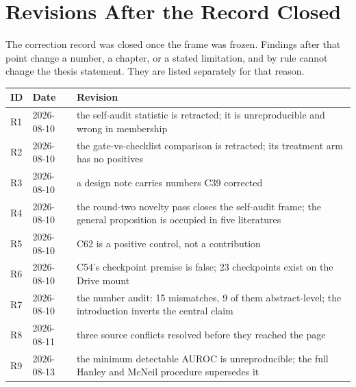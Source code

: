 \section{Revisions After the Record Closed}

The correction record was closed once the frame was frozen. Findings after that point
change a number, a chapter, or a stated limitation, and by rule cannot change the
thesis statement. They are listed separately for that reason.

\singlespacing
\renewcommand{\arraystretch}{0.9}
\footnotesize
\begin{longtable}{@{}p{0.35in}p{0.7in}p{4.5in}@{}}
\textbf{ID} & \textbf{Date} & \textbf{Revision}\\
\midrule
\endhead
R1 & 2026-08-10 & the self-audit statistic is retracted; it is unreproducible and wrong in membership\\
R2 & 2026-08-10 & the gate-vs-checklist comparison is retracted; its treatment arm has no positives\\
R3 & 2026-08-10 & a design note carries numbers C39 corrected\\
R4 & 2026-08-10 & the round-two novelty pass closes the self-audit frame; the general proposition is occupied in five literatures\\
R5 & 2026-08-10 & C62 is a positive control, not a contribution\\
R6 & 2026-08-10 & C54's checkpoint premise is false; 23 checkpoints exist on the Drive mount\\
R7 & 2026-08-10 & the number audit: 15 mismatches, 9 of them abstract-level; the introduction inverts the central claim\\
R8 & 2026-08-11 & three source conflicts resolved before they reached the page\\
R9 & 2026-08-13 & the minimum detectable AUROC is unreproducible; the full Hanley and McNeil procedure supersedes it\\
\end{longtable}
\normalsize
\doublespacing


